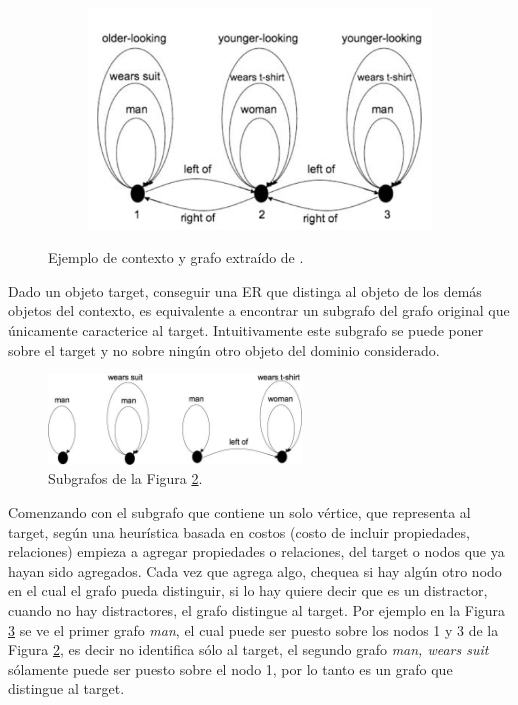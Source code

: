 \begin{figure}[!ht]
\begin{subfigure}{.50\textwidth}
\includegraphics[width=\textwidth]{images/grafo-survey.png}\\[0pt]
\label{grafo-survey}
\end{subfigure}
\caption{Ejemplo de contexto y grafo extra\'ido de \protect\cite{survey}.}\label{fig2-8}
\end{figure}



Dado un objeto target, conseguir una ER que distinga al objeto de los dem\'as objetos del contexto, es equivalente a encontrar un subgrafo del grafo original que \'unicamente caracterice al target. Intuitivamente este subgrafo se puede poner sobre el target y no sobre ning\'un otro objeto del dominio considerado.

\begin{figure}[ht]
\centering
\includegraphics[width=0.6\textwidth]{images/ref-exp-graph.png}
\caption{Subgrafos de la Figura \ref{fig2-8}.}
\label{ref-exp-graph}
\end{figure}

Comenzando con el subgrafo que contiene un solo v\'ertice, que representa al target, seg\'un una heur\'{i}stica basada en costos (costo de incluir propiedades, relaciones) empieza a agregar propiedades o relaciones, del target o nodos que ya hayan sido agregados. Cada vez que agrega algo, chequea si hay alg\'un otro nodo en el cual el grafo pueda distinguir, si lo hay quiere decir que es un distractor, cuando no hay distractores, el grafo distingue al target. Por ejemplo en la Figura \ref{ref-exp-graph} se ve el primer grafo {\it man}, el cual puede ser puesto sobre los nodos 1 y 3 de la Figura \ref{fig2-8}, es decir no identifica s\'olo al target, el segundo grafo {\it man, wears suit} s\'olamente puede ser puesto sobre el nodo 1, por lo tanto es un grafo que distingue al target.  

